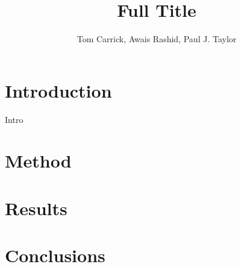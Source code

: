 \documentclass[floatsintext]{apa6}
\title{Full Title}
\author{Tom Carrick, Awais Rashid, Paul J. Taylor}
\affiliation{Security Lancaster / CREST, Lancaster University}
\begin{document}
    \maketitle{}

    \section{Introduction}
    Intro \parencite{wang2014linguistic}

    \section{Method}

    \section{Results}

    \section{Conclusions}

    \printbibliography{}
\end{document}
